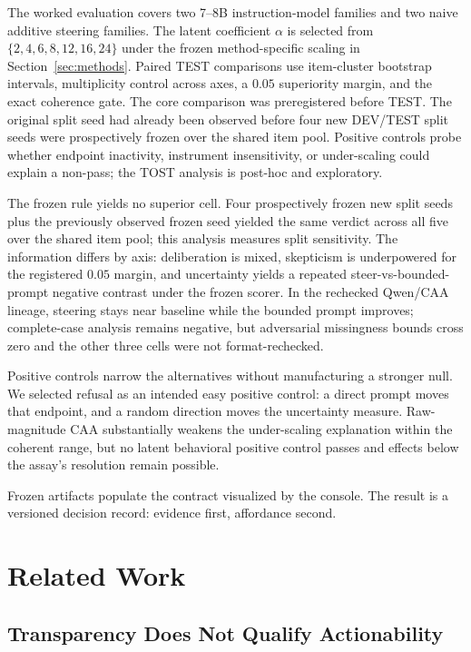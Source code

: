 \documentclass[sigconf]{acmart}
\begin{document}
The worked evaluation covers two 7--8B instruction-model families and two naive additive steering families. The latent coefficient \(\alpha\) is selected from \(\{2,4,6,8,12,16,24\}\) under the frozen method-specific scaling in Section~\ref{sec:methods}. Paired TEST comparisons use item-cluster bootstrap intervals, multiplicity control across axes, a \(0.05\) superiority margin, and the exact coherence gate. The core comparison was preregistered before TEST. The original split seed had already been observed before four new DEV/TEST split seeds were prospectively frozen over the shared item pool. Positive controls probe whether endpoint inactivity, instrument insensitivity, or under-scaling could explain a non-pass; the TOST analysis is post-hoc and exploratory.

The frozen rule yields no superior cell. Four prospectively frozen new split seeds plus the previously observed frozen seed yielded the same verdict across all five over the shared item pool; this analysis measures split sensitivity. The information differs by axis: deliberation is mixed, skepticism is underpowered for the registered \(0.05\) margin, and uncertainty yields a repeated steer-vs-bounded-prompt negative contrast under the frozen scorer. In the rechecked Qwen/CAA lineage, steering stays near baseline while the bounded prompt improves; complete-case analysis remains negative, but adversarial missingness bounds cross zero and the other three cells were not format-rechecked.

Positive controls narrow the alternatives without manufacturing a stronger null. We selected refusal as an intended easy positive control: a direct prompt moves that endpoint, and a random direction moves the uncertainty measure. Raw-magnitude CAA substantially weakens the under-scaling explanation within the coherent range, but no latent behavioral positive control passes and effects below the assay's resolution remain possible.

Frozen artifacts populate the contract visualized by the console. The result is a versioned decision record: evidence first, affordance second.

\section{Related Work}
\label{sec:related-work}

\subsection{Transparency Does Not Qualify Actionability}
\end{document}
